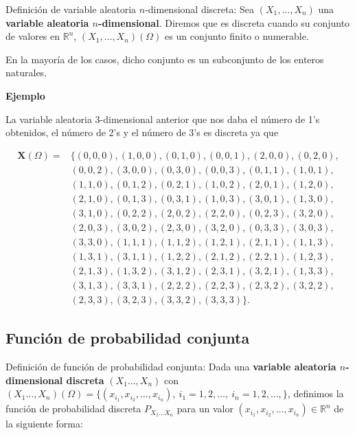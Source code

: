 \documentclass[]{book}
\begin{document}
Definición de variable aleatoria \(n\)-dimensional discreta:
Sea \((X_1,\ldots,X_n)\) una \textbf{variable aleatoria \(n\)-dimensional}. Diremos que es discreta cuando su conjunto de valores en \(\mathbb{R}^n\), \((X_1,\ldots,X_n)(\Omega)\) es un conjunto finito o numerable.

En la mayoría de los casos, dicho conjunto es un subconjunto de los enteros naturales.

\textbf{Ejemplo}

La variable aleatoria 3-dimensional anterior que nos daba el número de 1's obtenidos, el número de 2's y el número de 3's es discreta ya que

\[
\begin{array}{rl}
\mathbf{X}(\Omega) =& \{
  (0,0,0),(1,0,0),(0,1,0),(0,0,1),(2,0,0),(0,2,0),\\
& (0,0,2),(3,0,0),(0,3,0),(0,0,3),(0,1,1),(1,0,1),\\
&  (1,1,0),(0,1,2),(0,2,1),(1,0,2),(2,0,1),(1,2,0),\\
&  (2,1,0),(0,1,3),(0,3,1),(1,0,3),(3,0,1),(1,3,0),\\
&  (3,1,0),(0,2,2),(2,0,2),(2,2,0),(0,2,3),(3,2,0),\\
&  (2,0,3),(3,0,2),(2,3,0),(3,2,0),(0,3,3),(3,0,3),\\
&  (3,3,0),(1,1,1),(1,1,2),(1,2,1),(2,1,1),(1,1,3),\\
& (1,3,1),(3,1,1),(1,2,2),(2,1,2),(2,2,1),(1,2,3),\\
& (2,1,3),(1,3,2),(3,1,2),(2,3,1),(3,2,1),(1,3,3),\\
& (3,1,3),(3,3,1),(2,2,2),(2,2,3),(2,3,2),(3,2,2),\\
& (2,3,3),(3,2,3),(3,3,2),(3,3,3)\}.
\end{array}
\]

\hypertarget{funciuxf3n-de-probabilidad-conjunta-1}{%
\subsection{Función de probabilidad conjunta}\label{funciuxf3n-de-probabilidad-conjunta-1}}

Definición de función de probabilidad conjunta:
Dada una \textbf{variable aleatoria \(n\)-dimensional discreta} \((X_1\ldots,X_n)\) con \((X_1\ldots,X_n)(\Omega)=\{(x_{i_1},x_{i_2},\ldots,x_{i_n}),\ i_1=1,2,\ldots,\ i_n=1,2,\ldots,\}\), definimos la función de probabilidad discreta \(P_{X_1\ldots X_n}\) para un valor \((x_{i_1},x_{i_2},\ldots,x_{i_n})\in\mathbb{R}^n\) de la siguiente forma:
\end{document}
